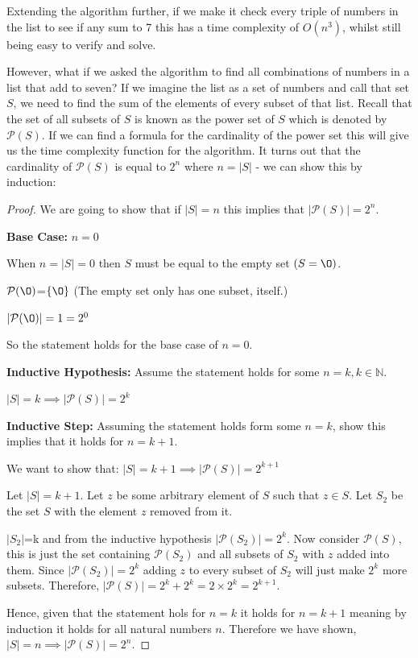 \documentclass[twoside,10pt]{article}
\begin{document}
Extending the algorithm further, if we make it check every triple of numbers in the list to see if any sum to 7 this has a time complexity of $O(n^3)$, whilst still being easy to verify and solve.

However, what if we asked the algorithm to find all combinations of numbers in a list that add to seven? If we imagine the list as a set of numbers and call that set $S$, we need to find the sum of the elements of every subset of that list. Recall that the set of all subsets of $S$ is known as the power set of $S$ which is denoted by $\mathcal{P}(S)$. If we can find a formula for the cardinality of the power set this will give us the time complexity function for the algorithm. It turns out that the cardinality of $\mathcal{P}(S)$ is equal to $2^n$ where $n=\lvert S\rvert$ - we can show this by induction:
\begin{proof} 
    We are going to show that if $\lvert S\rvert=n$ this implies that $\lvert\mathcal{P}(S)\rvert=2^n$.

\textbf{Base Case:} $n=0$

When $n=\lvert S\rvert=0$ then $S$ must be equal to the empty set $(S=\O)$. 

$\mathcal{P}(\O)$=$\{\O\}$ (The empty set only has one subset, itself.)

 $\lvert\mathcal{P}(\O)\rvert=1=2^0$

So the statement holds for the base case of $n=0$.

\textbf{Inductive Hypothesis:} Assume the statement holds for some $n=k,k\in\mathbb{N}.$

$\lvert S\rvert=k\implies\lvert\mathcal{P}(S)\rvert=2^k$

\textbf{Inductive Step:} Assuming the statement holds form some $n=k$, show this implies that it holds for $n=k+1$.

We want to show that: $\lvert S\rvert=k+1\implies\lvert\mathcal{P}(S)\rvert=2^{k+1}$

Let $\lvert S\rvert=k+1$. Let $z$ be some arbitrary element of $S$ such that $z\in S$. Let $S_{2}$ be the set $S$ with the element $z$ removed from it.

$\lvert S_{2}\rvert$=k and from the inductive hypothesis $\lvert\mathcal{P}(S_{2})\rvert=2^k$. Now consider $\mathcal{P}(S)$, this is just the set containing $\mathcal{P}(S_{2})$ and all subsets of $S_{2}$ with $z$ added into them. Since $\lvert\mathcal{P}(S_{2})\rvert=2^k$ adding $z$ to every subset of $S_{2}$ will just make $2^k$ more subsets. Therefore, $\lvert\mathcal{P}(S)\rvert=2^k+2^k=2\times 2^k=2^{k+1}$.

Hence, given that the statement hols for $n=k$ it holds for $n=k+1$ meaning by induction it holds for all natural numbers $n$. Therefore we have shown, $\lvert S\rvert=n\implies\lvert\mathcal{P}(S)\rvert=2^n$.
\end{proof}
\end{document}
